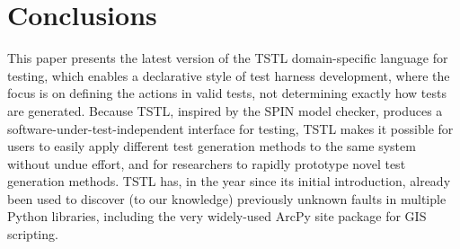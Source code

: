 \section{Conclusions}
\label{conclusion}

This paper presents the latest version of the TSTL
\cite{NFM15,ISSTA15,tstl} domain-specific language for testing, which
enables a declarative style of test harness development, where the
focus is on defining the actions in valid tests, not determining
exactly how tests are generated.  Because TSTL, inspired by the SPIN
model checker, produces a software-under-test-independent interface
for testing, TSTL makes it possible for users to easily apply
different test generation methods to the same system without undue
effort, and for researchers to rapidly prototype novel test generation
methods.  TSTL has, in the year since its initial introduction,
already been used to discover (to our knowledge) previously unknown
faults in multiple Python libraries, including the very widely-used
ArcPy site package for GIS scripting. 
